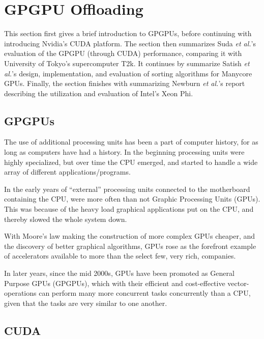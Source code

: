 
\section{GPGPU Offloading}
\label{sec:nvidia}

This section first gives a brief introduction to GPGPUs, before continuing with introducing Nvidia's CUDA platform.
The section then summarizes Suda \textit{et al.}'s\cite{Suda:2009:AGG:1509633.1509696} evaluation of the GPGPU (through CUDA) performance, comparing it with University of Tokyo's supercomputer T2k.
It continues by summarize Satish \textit{et al.}'s\cite{Satish:2009:DES:1586640.1587667} design, implementation, and evaluation of sorting algorithms for Manycore GPUs.
Finally, the section finishes with summarizing Newburn \textit{et al.}'s report describing the utilization and evaluation of Intel's Xeon Phi\texttrademark.

\subsection{GPGPUs}

The use of additional processing units has been a part of computer history, for as long as computers have had a history.
In the beginning processing units were highly specialized, but over time the CPU emerged, and started to handle a wide array of different applications/programs.

In the early years of ``external'' processing units connected to the motherboard containing the CPU, were more often than not Graphic Processing Units (GPUs).
This was because of the heavy load graphical applications put on the CPU, and thereby slowed the whole system down.

With Moore's law making the construction of more complex GPUs cheaper, and the discovery of better graphical algorithms, GPUs rose as the forefront example of accelerators available to more than the select few, very rich, companies.

In later years, since the mid 2000s, GPUs have been promoted as General Purpose GPUs (GPGPUs), which with their efficient and cost-effective vector-operations can perform many more concurrent tasks concurrently than a CPU, given that the tasks are very similar to one another.

\subsection{CUDA}

